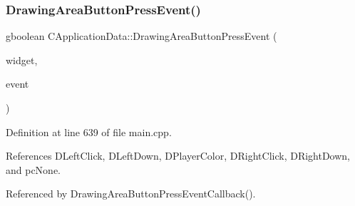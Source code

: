 \subsubsection{\texorpdfstring{Drawing\+Area\+Button\+Press\+Event()}{DrawingAreaButtonPressEvent()}}
{\footnotesize\ttfamily gboolean C\+Application\+Data\+::\+Drawing\+Area\+Button\+Press\+Event (\begin{DoxyParamCaption}\item[{Gtk\+Widget $\ast$}]{widget,  }\item[{Gdk\+Event\+Button $\ast$}]{event }\end{DoxyParamCaption})\hspace{0.3cm}{\ttfamily [protected]}}



Definition at line 639 of file main.\+cpp.



References D\+Left\+Click, D\+Left\+Down, D\+Player\+Color, D\+Right\+Click, D\+Right\+Down, and pc\+None.



Referenced by Drawing\+Area\+Button\+Press\+Event\+Callback().


